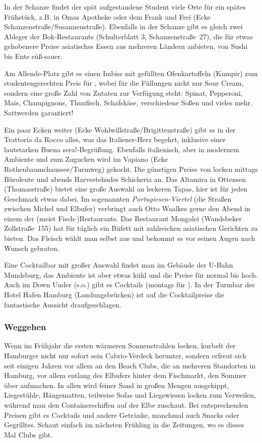 In der Schanze findet der spät aufgestandene Student viele Orte für ein spätes
Frühstück, z.B. in Omas Apotheke oder dem Frank und Frei (Ecke
Schanzenstraße/Susannenstraße). Ebenfalls in der Schanze gibt es gleich zwei
Ableger der Bok-Restaurants (Schulterblatt 3, Schanzenstraße~27), die für etwas
gehobenere Preise asiatisches Essen aus mehreren Ländern anbieten, von Sushi
bis Ente süß-sauer.

\begin{advice}
Am Allende-Platz gibt es einen Imbiss mit gefüllten Ofenkartoffeln (Kumpir) zum
studentengerechten Preis für , wobei für die Füllungen nicht nur
Sour Cream, sondern eine große Zahl von Zutaten zur Verfügung steht: Spinat,
Pepperoni, Mais, Champignons, Thunfisch, Schafskäse, verschiedene Soßen und
vieles mehr. Sattwerden garantiert!
\end{advice}

Ein paar Ecken weiter (Ecke Wohlwillstraße/Brigittenstraße) gibt es in der
Trattoria da Rocco alles, was das Italiener-Herz begehrt, inklusive einer
lautstarken \glqq Buena sera!\grqq-Begrüßung. Ebenfalls italienisch, aber in
modernem Ambiente und zum Zugucken wird im Vapiano (Ecke
Rothenbaumchaussee/Turmweg) gekocht. Die günstigen Preise von 
locken mittags Büroleute und abends Harvestehudes Schickeria an. Das Altamira
in Ottensen (Thomasstraße) bietet eine große Auswahl an leckeren Tapas, hier
ist für jeden Geschmack etwas dabei. Im sogenannten \emph{Portugiesen-Viertel}
(die Straßen zwischen Michel und Elbufer) verbringt auch Otto Waalkes gerne den
Abend in einem der (meist Fisch-)Restaurants. Das Restaurant Mongolei
(Wandsbeker Zollstraße~155) hat für  täglich ein Büfett mit
zahlreichen asiatischen Gerichten zu bieten. Das Fleisch wählt man selbst aus
und bekommt es vor seinen Augen nach Wunsch gebraten.

Eine Cocktailbar mit großer Auswahl findet man im Gebäude der U-Bahn Mundsburg,
das Ambiente ist aber etwas kühl und die Preise für  normal bis hoch.
Auch im Down Under (s.o.) gibt es Cocktails (montags für ). In der
Turmbar des Hotel Hafen Hamburg (Landungsbrücken) ist auf die Cocktailpreise
die fantastische Aussicht draufgeschlagen.

\subsubsection{Weggehen}

Wenn im Frühjahr die ersten wärmeren Sonnenstrahlen locken, kurbelt der
Hamburger nicht nur sofort sein Cabrio-Verdeck herunter, sondern erfreut sich
seit einigen Jahren vor allem an den Beach Clubs, die an mehreren Standorten in
Hamburg, vor allem entlang des Elbufers hinter dem Fischmarkt, den Sommer über
aufmachen. In allen wird feiner Sand in großen Mengen ausgekippt, Liegestühle,
Hängematten, teilweise Sofas und Liegewiesen locken zum Verweilen, während man
den Containerschiffen auf der Elbe zuschaut. Bei entsprechenden Preisen gibt es
Cocktails und andere Getränke, manchmal auch Snacks oder Gegrilltes. Schaut
einfach im nächsten Frühling in die Zeitungen, wo es dieses Mal Clubs gibt.


